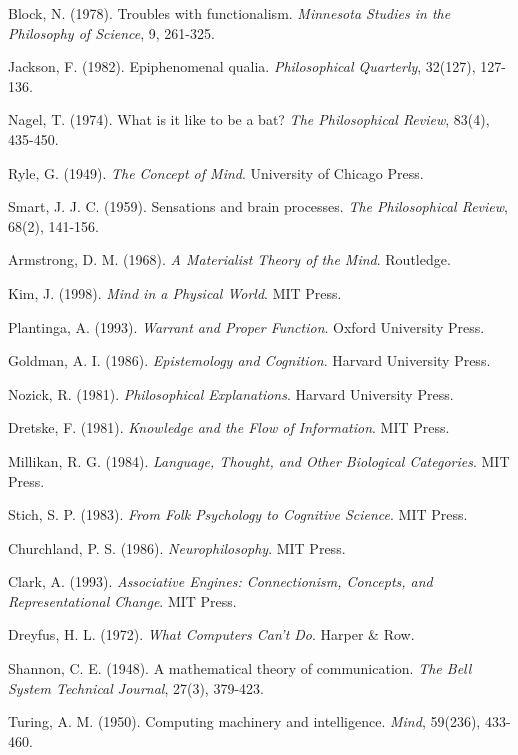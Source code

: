 \documentclass[12pt,a4paper]{article}
\begin{document}
\begin{thebibliography}{99}
Block, N. (1978). Troubles with functionalism. \textit{Minnesota Studies in the Philosophy of Science}, 9, 261-325.

Jackson, F. (1982). Epiphenomenal qualia. \textit{Philosophical Quarterly}, 32(127), 127-136.

Nagel, T. (1974). What is it like to be a bat? \textit{The Philosophical Review}, 83(4), 435-450.

Ryle, G. (1949). \textit{The Concept of Mind}. University of Chicago Press.

Smart, J. J. C. (1959). Sensations and brain processes. \textit{The Philosophical Review}, 68(2), 141-156.

Armstrong, D. M. (1968). \textit{A Materialist Theory of the Mind}. Routledge.

Kim, J. (1998). \textit{Mind in a Physical World}. MIT Press.

Plantinga, A. (1993). \textit{Warrant and Proper Function}. Oxford University Press.

Goldman, A. I. (1986). \textit{Epistemology and Cognition}. Harvard University Press.

Nozick, R. (1981). \textit{Philosophical Explanations}. Harvard University Press.

Dretske, F. (1981). \textit{Knowledge and the Flow of Information}. MIT Press.

Millikan, R. G. (1984). \textit{Language, Thought, and Other Biological Categories}. MIT Press.

Stich, S. P. (1983). \textit{From Folk Psychology to Cognitive Science}. MIT Press.

Churchland, P. S. (1986). \textit{Neurophilosophy}. MIT Press.

Clark, A. (1993). \textit{Associative Engines: Connectionism, Concepts, and Representational Change}. MIT Press.

Dreyfus, H. L. (1972). \textit{What Computers Can't Do}. Harper \& Row.

Shannon, C. E. (1948). A mathematical theory of communication. \textit{The Bell System Technical Journal}, 27(3), 379-423.

Turing, A. M. (1950). Computing machinery and intelligence. \textit{Mind}, 59(236), 433-460.


\end{thebibliography}
\end{document}
